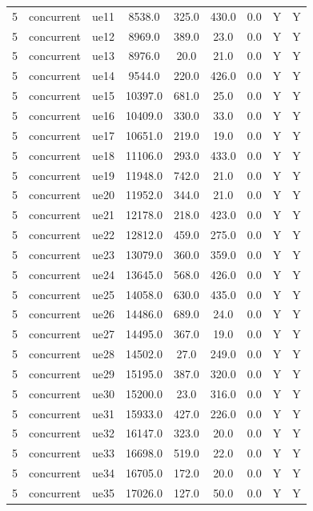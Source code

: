 \begin{table}[ht]
\begin{tabular}{|c|c|c|c|c|c|c|c|c|}
5 & concurrent & ue11 & 8538.0 & 325.0 & 430.0 & 0.0 & Y & Y \\
5 & concurrent & ue12 & 8969.0 & 389.0 & 23.0 & 0.0 & Y & Y \\
5 & concurrent & ue13 & 8976.0 & 20.0 & 21.0 & 0.0 & Y & Y \\
5 & concurrent & ue14 & 9544.0 & 220.0 & 426.0 & 0.0 & Y & Y \\
5 & concurrent & ue15 & 10397.0 & 681.0 & 25.0 & 0.0 & Y & Y \\
5 & concurrent & ue16 & 10409.0 & 330.0 & 33.0 & 0.0 & Y & Y \\
5 & concurrent & ue17 & 10651.0 & 219.0 & 19.0 & 0.0 & Y & Y \\
5 & concurrent & ue18 & 11106.0 & 293.0 & 433.0 & 0.0 & Y & Y \\
5 & concurrent & ue19 & 11948.0 & 742.0 & 21.0 & 0.0 & Y & Y \\
5 & concurrent & ue20 & 11952.0 & 344.0 & 21.0 & 0.0 & Y & Y \\
5 & concurrent & ue21 & 12178.0 & 218.0 & 423.0 & 0.0 & Y & Y \\
5 & concurrent & ue22 & 12812.0 & 459.0 & 275.0 & 0.0 & Y & Y \\
5 & concurrent & ue23 & 13079.0 & 360.0 & 359.0 & 0.0 & Y & Y \\
5 & concurrent & ue24 & 13645.0 & 568.0 & 426.0 & 0.0 & Y & Y \\
5 & concurrent & ue25 & 14058.0 & 630.0 & 435.0 & 0.0 & Y & Y \\
5 & concurrent & ue26 & 14486.0 & 689.0 & 24.0 & 0.0 & Y & Y \\
5 & concurrent & ue27 & 14495.0 & 367.0 & 19.0 & 0.0 & Y & Y \\
5 & concurrent & ue28 & 14502.0 & 27.0 & 249.0 & 0.0 & Y & Y \\
5 & concurrent & ue29 & 15195.0 & 387.0 & 320.0 & 0.0 & Y & Y \\
5 & concurrent & ue30 & 15200.0 & 23.0 & 316.0 & 0.0 & Y & Y \\
5 & concurrent & ue31 & 15933.0 & 427.0 & 226.0 & 0.0 & Y & Y \\
5 & concurrent & ue32 & 16147.0 & 323.0 & 20.0 & 0.0 & Y & Y \\
5 & concurrent & ue33 & 16698.0 & 519.0 & 22.0 & 0.0 & Y & Y \\
5 & concurrent & ue34 & 16705.0 & 172.0 & 20.0 & 0.0 & Y & Y \\
5 & concurrent & ue35 & 17026.0 & 127.0 & 50.0 & 0.0 & Y & Y \\

\end{tabular}
\end{table}
